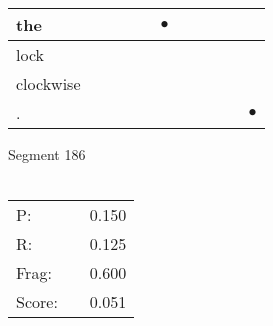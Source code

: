 \documentclass[landscape]{article}
\newcommand{\ssp}{\hspace{2pt}}
\newcommand{\mex}{\cellcolor{g}$\bullet$}
\begin{document}
\begin{tabular}{|l|p{10pt}|p{10pt}|p{10pt}|p{10pt}|p{10pt}|p{10pt}|p{10pt}|p{10pt}|p{10pt}|p{10pt}|}
\hline
\ssp \cellcolor{ref4}the \ssp&\hspace{2pt}&\hspace{2pt}&\hspace{2pt}&\hspace{2pt}&\hspace{2pt}\mex&\hspace{2pt}&\hspace{2pt}&\hspace{2pt}&\hspace{2pt}&\hspace{2pt}\\
\hline
\ssp lock \ssp&\hspace{2pt}&\hspace{2pt}&\hspace{2pt}&\hspace{2pt}&\hspace{2pt}&\hspace{2pt}&\hspace{2pt}&\hspace{2pt}&\hspace{2pt}&\hspace{2pt}\\
\hline
\ssp clockwise \ssp&\hspace{2pt}&\hspace{2pt}&\hspace{2pt}&\hspace{2pt}&\hspace{2pt}&\hspace{2pt}&\hspace{2pt}&\hspace{2pt}&\hspace{2pt}&\hspace{2pt}\\
\hline
\ssp \cellcolor{ref9}. \ssp&\hspace{2pt}&\hspace{2pt}&\hspace{2pt}&\hspace{2pt}&\hspace{2pt}&\hspace{2pt}&\hspace{2pt}&\hspace{2pt}&\hspace{2pt}&\hspace{2pt}\mex\\
\hline
\end{tabular}

\vspace{6pt}
\noindent Segment 186\\\\
\noindent\begin{tabular}{lm{12pt}r}
\hline
P:&&0.150\\
R:&&0.125\\
Frag:&&0.600\\
Score:&&0.051\\
\end{tabular}
\end{document}
